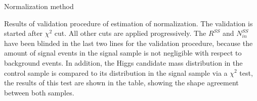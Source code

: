\begin{frame}{Normalization method}
\vspace{-.2cm}
    \begin{block}{}
      \tiny \centering Results of validation procedure of estimation of normalization. The validation is started after $\chi^{2}$ cut. All other cuts are applied progressively. The $R^{SS}$ and $N^{SS}_{in}$ have been blinded in the last two lines for the validation procedure, because the amount of signal events in the signal sample is not negligible with respect to background events. In addition, the Higgs candidate mass distribution in the control sample is compared to its distribution in the signal sample via a $\chi^{2}$ test, the results of this test are shown in the table, showing the shape agreement between both samples.
    \end{block}

\end{frame}

